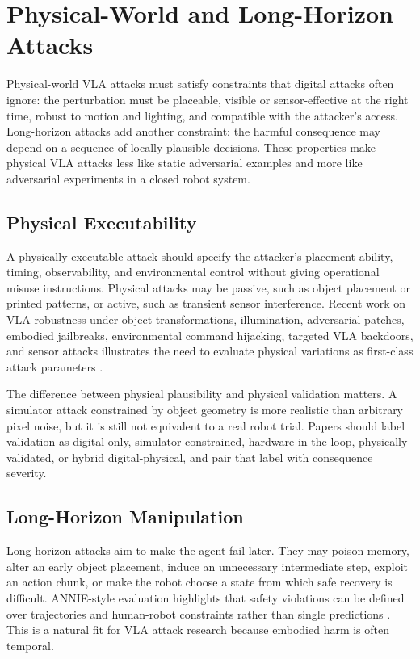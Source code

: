 \section{Physical-World and Long-Horizon Attacks}
\label{sec:physical-long-horizon}

Physical-world VLA attacks must satisfy constraints that digital attacks often ignore: the perturbation must be placeable, visible or sensor-effective at the right time, robust to motion and lighting, and compatible with the attacker's access. Long-horizon attacks add another constraint: the harmful consequence may depend on a sequence of locally plausible decisions. These properties make physical VLA attacks less like static adversarial examples and more like adversarial experiments in a closed robot system.

\subsection{Physical Executability}

A physically executable attack should specify the attacker's placement ability, timing, observability, and environmental control without giving operational misuse instructions. Physical attacks may be passive, such as object placement or printed patterns, or active, such as transient sensor interference. Recent work on VLA robustness under object transformations, illumination, adversarial patches, embodied jailbreaks, environmental command hijacking, targeted VLA backdoors, and sensor attacks illustrates the need to evaluate physical variations as first-class attack parameters \cite{zhang2025badrobot,robey2025robopair,wang2025vlaadversarial,burbano2025chai,li2025attackvla,liu2025evavla,lu2025phantom}.

The difference between physical plausibility and physical validation matters. A simulator attack constrained by object geometry is more realistic than arbitrary pixel noise, but it is still not equivalent to a real robot trial. Papers should label validation as digital-only, simulator-constrained, hardware-in-the-loop, physically validated, or hybrid digital-physical, and pair that label with consequence severity.

\subsection{Long-Horizon Manipulation}

Long-horizon attacks aim to make the agent fail later. They may poison memory, alter an early object placement, induce an unnecessary intermediate step, exploit an action chunk, or make the robot choose a state from which safe recovery is difficult. ANNIE-style evaluation highlights that safety violations can be defined over trajectories and human-robot constraints rather than single predictions \cite{huang2025annie}. This is a natural fit for VLA attack research because embodied harm is often temporal.

